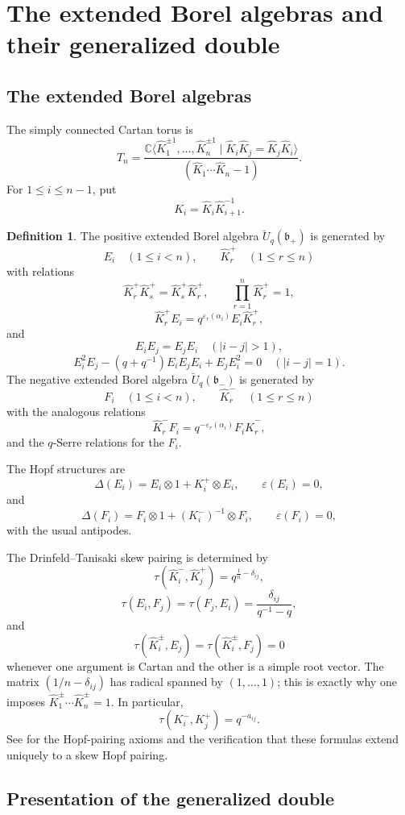 \documentclass[11pt]{amsart}
\theoremstyle{definition}
\newtheorem{definition}[theorem]{Definition}
\theoremstyle{remark}
\newcommand{\C}{\mathbb C}
\newcommand{\eps}{\varepsilon}
\begin{document}
\section{The extended Borel algebras and their generalized double}

\subsection{The extended Borel algebras}

The simply connected Cartan torus is
\[
T_n=
\frac{\C\langle \hat K_1^{\pm1},\dots,\hat K_n^{\pm1}\mid
\hat K_i\hat K_j=\hat K_j\hat K_i\rangle}
{(\hat K_1\cdots\hat K_n-1)}.
\]
For \(1\leq i\leq n-1\), put
\[
K_i=\hat K_i\hat K_{i+1}^{-1}.
\]

\begin{definition}
The positive extended Borel algebra
\(\breve U_q(\mathfrak b_+)\) is generated by
\[
E_i\quad(1\leq i<n),\qquad \hat K_r^+\quad(1\leq r\leq n)
\]
with relations
\[
\hat K_r^+\hat K_s^+=\hat K_s^+\hat K_r^+,\qquad
\prod_{r=1}^n\hat K_r^+=1,
\]
\[
\hat K_r^+E_i
=q^{\eps_r(\alpha_i)}E_i\hat K_r^+,
\]
and
\[
E_iE_j=E_jE_i\quad(|i-j|>1),
\]
\[
E_i^2E_j-(q+q^{-1})E_iE_jE_i+E_jE_i^2=0
\quad(|i-j|=1).
\]
The negative extended Borel algebra
\(\breve U_q(\mathfrak b_-)\) is generated by
\[
F_i\quad(1\leq i<n),\qquad \hat K_r^-\quad(1\leq r\leq n)
\]
with the analogous relations
\[
\hat K_r^-F_i
=q^{-\eps_r(\alpha_i)}F_i\hat K_r^-,
\]
and the \(q\)-Serre relations for the \(F_i\).
\end{definition}

The Hopf structures are
\[
\Delta(E_i)=E_i\otimes1+K_i^+\otimes E_i,\qquad
\varepsilon(E_i)=0,
\]
and
\[
\Delta(F_i)=F_i\otimes1+(K_i^-)^{-1}\otimes F_i,\qquad
\varepsilon(F_i)=0,
\]
with the usual antipodes.

The Drinfeld--Tanisaki skew pairing is determined by
\[
\tau(\hat K_i^-,\hat K_j^+)
=q^{\frac1n-\delta_{ij}},
\]
\[
\tau(E_i,F_j)=\tau(F_j,E_i)
=\frac{\delta_{ij}}{q^{-1}-q},
\]
and
\[
\tau(\hat K_i^\pm,E_j)=\tau(\hat K_i^\pm,F_j)=0
\]
whenever one argument is Cartan and the other is a simple root vector.
The matrix \((1/n-\delta_{ij})\) has radical spanned by
\((1,\dots,1)\); this is exactly why one imposes
\(\hat K_1^\pm\cdots\hat K_n^\pm=1\).  In particular,
\[
\tau(K_i^-,K_j^+)=q^{-a_{ij}}.
\]
See \cite[Chapter~8]{KS} for the Hopf-pairing axioms and the verification
that these formulas extend uniquely to a skew Hopf pairing.

\subsection{Presentation of the generalized double}
\end{document}
